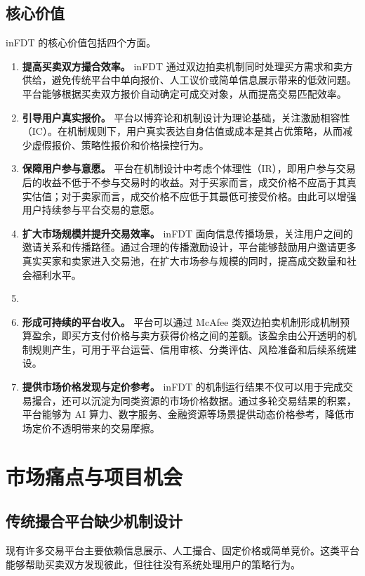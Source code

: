 \documentclass[UTF8,a4paper,12pt]{ctexart}
\begin{document}
\subsection{核心价值}

inFDT 的核心价值包括四个方面。

\begin{enumerate}
    \item \textbf{提高买卖双方撮合效率。} inFDT 通过双边拍卖机制同时处理买方需求和卖方供给，避免传统平台中单向报价、人工议价或简单信息展示带来的低效问题。平台能够根据买卖双方报价自动确定可成交对象，从而提高交易匹配效率。
    \item \textbf{引导用户真实报价。} 平台以博弈论和机制设计为理论基础，关注激励相容性（IC）。在机制规则下，用户真实表达自身估值或成本是其占优策略，从而减少虚假报价、策略性报价和价格操控行为。
    \item \textbf{保障用户参与意愿。} 平台在机制设计中考虑个体理性（IR），即用户参与交易后的收益不低于不参与交易时的收益。对于买家而言，成交价格不应高于其真实估值；对于卖家而言，成交价格不应低于其最低可接受价格。由此可以增强用户持续参与平台交易的意愿。
    \item \textbf{扩大市场规模并提升交易效率。} inFDT 面向信息传播场景，关注用户之间的邀请关系和传播路径。通过合理的传播激励设计，平台能够鼓励用户邀请更多真实买家和卖家进入交易池，在扩大市场参与规模的同时，提高成交数量和社会福利水平。 \item
    \item\textbf{形成可持续的平台收入。} 平台可以通过 McAfee 类双边拍卖机制形成机制预算盈余，即买方支付价格与卖方获得价格之间的差额。该盈余由公开透明的机制规则产生，可用于平台运营、信用审核、分类评估、风险准备和后续系统建设。
    \item \textbf{提供市场价格发现与定价参考。} inFDT 的机制运行结果不仅可以用于完成交易撮合，还可以沉淀为同类资源的市场价格数据。通过多轮交易结果的积累，平台能够为 AI 算力、数字服务、金融资源等场景提供动态价格参考，降低市场定价不透明带来的交易摩擦。 \end{enumerate}


\newpage
\section{市场痛点与项目机会}

\subsection{传统撮合平台缺少机制设计}

现有许多交易平台主要依赖信息展示、人工撮合、固定价格或简单竞价。这类平台能够帮助买卖双方发现彼此，但往往没有系统处理用户的策略行为。
\end{document}
